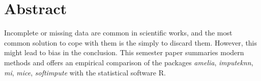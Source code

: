 \chapter*{Abstract}

Incomplete or missing data are common in scientific works, and the most common
solution to cope with them is the simply to discard them. However, this might
lead to bias in the conclusion. This semester paper summaries modern methods
and offers an empirical comparison of the packages \emph{amelia},
\emph{imputeknn}, \emph{mi}, \emph{mice}, \emph{softimpute} with the
statistical software R.



